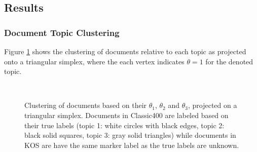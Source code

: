 \documentclass[10pt]{article}
\begin{document}
%
%
\subsection{Results}

\subsubsection{Document Topic Clustering}
Figure \ref{fig:cluserting} shows the clustering of documents relative to each topic as projected onto a triangular simplex, where the each vertex indicates $\theta = 1$ for the denoted topic.


\begin{figure}[t]
    \centering
    \mbox{ \quad
        }
    \caption{Clustering of documents based on their $\theta_1$, $\theta_2$ and $\theta_3$, projected on a triangular simplex. Documents in Classic400 are labeled based on their true labels (topic 1: white circles with black edges, topic 2: black solid squares, topic 3: gray solid triangles) while documents in KOS are have the same marker label as the true labels are unknown.}
    \label{fig:cluserting}
\end{figure}
\end{document}
